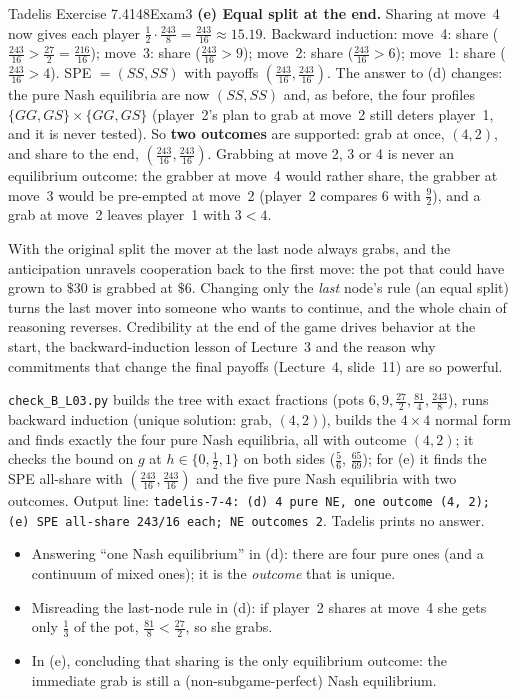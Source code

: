 \begin{exsol}{Tadelis Exercise 7.4}{148}{Exam}{3}
\textbf{(e) Equal split at the end.} Sharing at move~4 now gives each player
$\frac12\cdot\frac{243}{8} = \frac{243}{16} \approx 15.19$. Backward induction: move~4: share
($\frac{243}{16} > \frac{27}{2} = \frac{216}{16}$); move~3: share ($\frac{243}{16} > 9$); move~2:
share ($\frac{243}{16} > 6$); move~1: share ($\frac{243}{16} > 4$). SPE $= (SS, SS)$ with payoffs
$(\frac{243}{16}, \frac{243}{16})$. The answer to (d) changes: the pure Nash equilibria are now
$(SS, SS)$ and, as before, the four profiles $\{GG,GS\}\times\{GG,GS\}$ (player~2's plan to grab at
move~2 still deters player~1, and it is never tested). So \textbf{two outcomes} are supported: grab
at once, $(4,2)$, and share to the end, $(\frac{243}{16}, \frac{243}{16})$. Grabbing at move 2, 3 or
4 is never an equilibrium outcome: the grabber at move~4 would rather share, the grabber at move~3
would be pre-empted at move~2 (player~2 compares $6$ with $\frac92$), and a grab at move~2 leaves
player~1 with $3 < 4$.

\interp With the original split the mover at the last node always grabs, and the anticipation
unravels cooperation back to the first move: the pot that could have grown to $\$30$ is
grabbed at $\$6$. Changing only the \emph{last} node's rule (an equal split) turns the last mover
into someone who wants to continue, and the whole chain of reasoning reverses. Credibility at the
end of the game drives behavior at the start, the backward-induction lesson of Lecture~3 and the
reason why commitments that change the final payoffs (Lecture~4, slide~11) are so powerful.

\verify \texttt{check\_B\_L03.py} builds the tree with exact fractions (pots
$6, 9, \frac{27}{2}, \frac{81}{4}, \frac{243}{8}$), runs backward induction (unique solution:
grab, $(4,2)$), builds the $4\times4$ normal form and finds exactly the four pure Nash equilibria,
all with outcome $(4,2)$; it checks the bound on $g$ at $h \in \{0, \frac12, 1\}$ on both sides
($\frac56$, $\frac{65}{69}$); for (e) it finds the SPE all-share with
$(\frac{243}{16}, \frac{243}{16})$ and the five pure Nash equilibria with two outcomes. Output line:
\texttt{tadelis-7-4: (d) 4 pure NE, one outcome (4, 2); (e) SPE all-share 243/16 each; NE outcomes
2}. Tadelis prints no answer.

\mistakes
\begin{itemize}
  \item Answering ``one Nash equilibrium'' in (d): there are four pure ones (and a continuum of
  mixed ones); it is the \emph{outcome} that is unique.
  \item Misreading the last-node rule in (d): if player~2 shares at move~4 she gets only $\frac13$
  of the pot, $\frac{81}{8} < \frac{27}{2}$, so she grabs.
  \item In (e), concluding that sharing is the only equilibrium outcome: the immediate grab is still
  a (non-subgame-perfect) Nash equilibrium.
\end{itemize}


\end{exsol}
